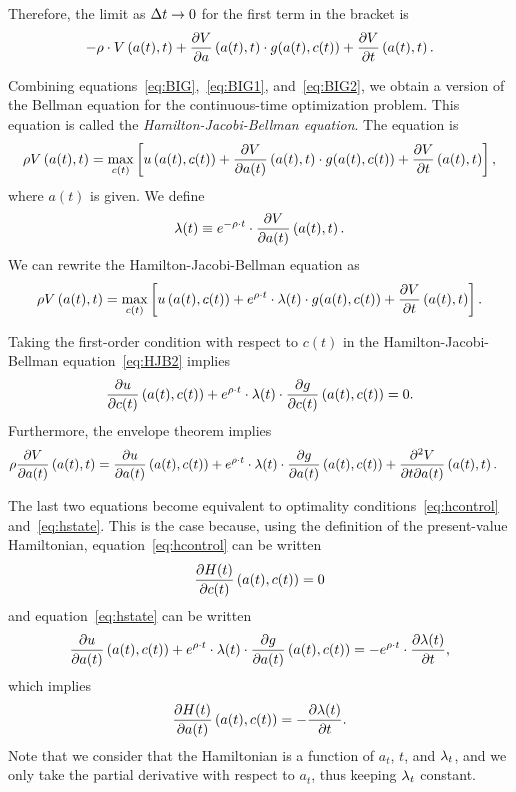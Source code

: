 \documentclass[letterpaper,12pt,leqno]{article}
\begin{document}
Therefore, the limit as $\Delta t\to 0$ for the first term in the bracket is 
\begin{equation}
-\rho \cdot V\left(  a(t),t \right)+\frac{\partial  V}{\partial a}\left(  a(t),t \right) \cdot g(a(t),c(t))+\frac{\partial V}{\partial t}\left( a(t),t \right).\label{eq:BIG2}
\end{equation}

Combining equations~\eqref{eq:BIG},~\eqref{eq:BIG1}, and~\eqref{eq:BIG2}, we obtain a version of the Bellman equation for the   continuous-time optimization problem. This equation is called the \textit{Hamilton-Jacobi-Bellman equation}. The equation is
\begin{equation}
\r V\bp{ a(t),t} =\max_{c(t)}\bs{ u\bp{a(t),c(t)} +\pd{V}{a(t)}\bp{a(t),t}\cdot
g(a(t),c(t)) +\pd{V}{t}\bp{a(t),t}}, \label{eq:HJB}
\end{equation}
where $a(t)$ is given. We define \[\lambda (t)\equiv e^{-\rho \cdot t}\cdot \frac{\partial V}{\partial a(t)}\left( a(t),t \right).\]
We can rewrite the Hamilton-Jacobi-Bellman equation as
\begin{equation}
\r V\bp{ a(t),t} =\max_{c(t)}\bs{ u\bp{a(t),c(t)} +e^{\r \cdot t}\cdot\l (t)  \cdot
g(a(t),c(t)) +\pd{V}{t}\bp{a(t),t}}. \label{eq:HJB2}
\end{equation}


Taking the first-order condition with respect to $c(t)$ in the Hamilton-Jacobi-Bellman equation~\eqref{eq:HJB2} implies
\begin{equation*}
\frac{\partial u}{\partial c(t)}\left( a(t),c(t) \right)+e^{\rho \cdot t}\cdot\lambda (t) \cdot \frac{\partial g}{\partial c(t)}\left( a(t),c(t) \right)=0.
\end{equation*}
Furthermore, the envelope theorem implies
\begin{align*}
\rho \frac{\partial V}{\partial a(t)}\left( a(t),t \right)&=\frac{\partial u}{\partial a(t)}\left( a(t),c(t) \right)+e^{\rho \cdot t}\cdot\lambda (t)\cdot \frac{\partial g}{\partial a(t)}\left(  a(t),c(t) \right)+\frac{\partial^{2}V}{\partial t\partial a(t)}\left( a(t),t \right).
\end{align*}

The last two equations become equivalent to optimality conditions~\eqref{eq:hcontrol} and~\eqref{eq:hstate}. This is the case because, using the definition of the present-value Hamiltonian, equation~\eqref{eq:hcontrol} can be written
\[\frac{\partial H(t)}{\partial c(t)}\left( a(t),c(t) \right) =0\]
and equation~\eqref{eq:hstate} can be written
\[\frac{\partial u}{\partial a(t)}\left( a(t),c(t) \right) +e^{\rho\cdot  t}\cdot \lambda(t)\cdot \frac{\partial g}{\partial a(t)}\left( a(t),c(t) \right)=-e^{\rho\cdot  t}\cdot \frac{\partial \lambda(t)}{\partial t},\]
which implies
\[\frac{\partial H(t)}{\partial a(t)}\left( a(t),c(t) \right) =-\frac{\partial \lambda(t)}{\partial t}.\]
Note that we consider that the Hamiltonian is a function of $a_{t}$, $t$, and $\lambda_{t}$, and we only take the partial derivative with respect to $a_{t}$, thus keeping $\lambda_{t}$ constant.
\end{document}

